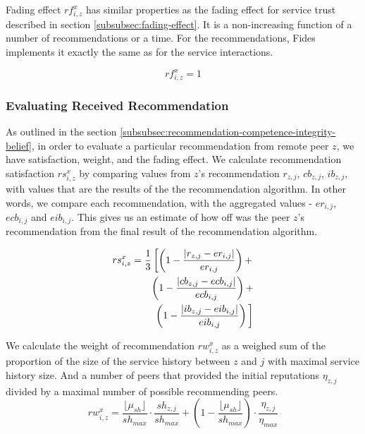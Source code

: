 Fading effect $rf^{x}_{i, z}$ has similar properties as the fading effect for service trust described in section \ref{subsubsec:fading-effect}. It is a non-increasing function of a number of recommendations or a time. 
For the recommendations, Fides implements it exactly the same as for the service interactions.

\begin{equation}
    rf^{x}_{i, z} = 1
\end{equation}

\subsubsection{Evaluating Received Recommendation}
As outlined in the section \ref{subsubsec:recommendation-competence-integrity-belief}, in order to evaluate a particular recommendation from remote peer $z$, we have satisfaction, weight, and the fading effect. 
We calculate recommendation satisfaction $rs^{x}_{i,z}$ by comparing values from $z$'s recommendation $r_{z,j}$, $cb_{z,j}$, $ib_{z,j}$, with values that are the results of the the recommendation algorithm.
In other words, we compare each recommendation, with the aggregated values - $er_{i,j}$, $ecb_{i,j}$ and $eib_{i,j}$. This gives us an estimate of how off was the peer $z$'s recommendation from the final result of the recommendation algorithm.

\begin{equation}
\begin{split}
    rs^{x}_{i,z} = \frac{1}{3} \left[ \left(1-\frac{\left|r_{z, j} - er_{i,j}\right|}{er_{i,j}}\right) + \right. \\
    \left(1 - \frac{\left|cb_{z, j} - ecb_{i, j}\right|}{ecb_{i, j}}\right) + \\
    \left. \left(1 - \frac{\left|ib_{z, j} - eib_{i, j}\right|}{eib_{i, j}}\right)\vphantom{\frac{1}{2}}\right]
\end{split}
\end{equation}

We calculate the weight of recommendation $rw^{x}_{i,z}$ as a weighed sum of the proportion of the size of the service history between $z$ and $j$ with maximal service history size. And a number of peers that provided the initial reputations $\eta_{z,j}$ divided by a maximal number of possible recommending peers.
\begin{equation}
    rw^{x}_{i,z} = \frac{\lfloor\mu_{sh}\rfloor}{sh_{max}} \cdot \frac{sh_{z, j}}{sh_{max}} + \left(1 - \frac{\lfloor\mu_{sh}\rfloor}{sh_{max}}\right) \cdot \frac{\eta_{z,j}}{\eta_{max}}
\end{equation}
